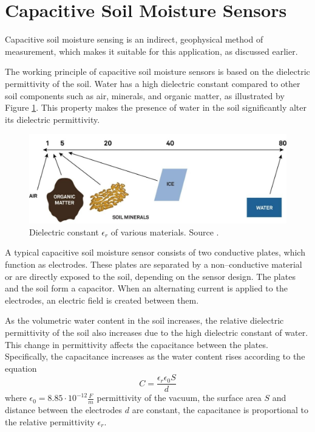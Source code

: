 \section{\label{section:soil-moisure-sensors-theory}Capacitive Soil Moisture Sensors}
Capacitive soil moisture sensing is an indirect, geophysical method of measurement, which makes it suitable for this application, as discussed earlier.

The working principle of capacitive soil moisture sensors is based on the dielectric permittivity of the soil. Water has a high dielectric constant compared to other soil components such as air, minerals, and organic matter, as illustrated by Figure \ref{fig:dielectric-constant}. This property makes the presence of water in the soil significantly alter its dielectric permittivity.

\begin{figure}
    \includegraphics[width=.7\textwidth]{fig/dielectric-constant.jpg}
    \caption{\label{fig:dielectric-constant}Dielectric constant $\epsilon_r$ of various materials. Source \cite{meter_group_soil_2023}.}
\end{figure}

A typical capacitive soil moisture sensor consists of two conductive plates, which function as electrodes. These plates are separated by a non--conductive material or are directly exposed to the soil, depending on the sensor design. The plates and the soil form a capacitor. When an alternating current is applied to the electrodes, an electric field is created between them.

As the volumetric water content in the soil increases, the relative dielectric permittivity of the soil also increases due to the high dielectric constant of water. This change in permittivity affects the capacitance between the plates. Specifically, the capacitance increases as the water content rises according to the equation
\begin{equation}
    \label{equation:capacitance} C = \dfrac{\epsilon_r \epsilon_0 S}{d}
\end{equation}
where $\epsilon_0 = 8.85 \cdot 10^{-12} \frac{F}{m}$ permittivity of the vacuum, the surface area $S$ and distance between the electrodes $d$ are constant, the capacitance is proportional to the relative permittivity $\epsilon_r$.

